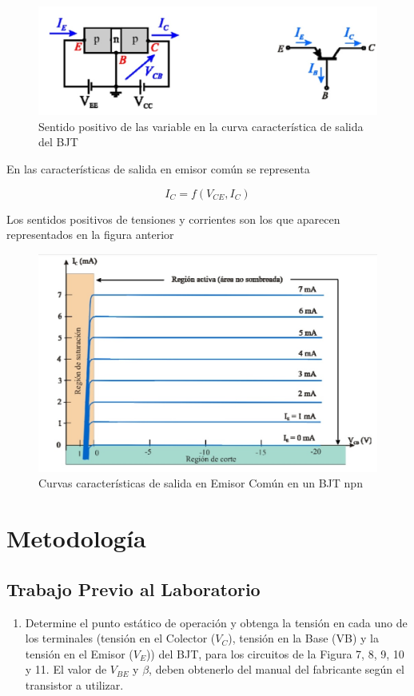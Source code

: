 \documentclass[10pt, a4paper]{article}
\begin{document}
    \begin{figure}[h!]
        \centering
        \includegraphics[height=4cm\textwidth]{salida.jpg}
        \caption{\label{fig:5} Sentido positivo de las variable en la curva característica de salida del BJT}
    \end{figure}

    En las características de salida en emisor común se representa
    
    $$I_C = f(V_{CE}, I_C)$$

    Los sentidos positivos de tensiones y corrientes son los que aparecen representados en la figura anterior

    \begin{figure}[h!]
        \centering
        \includegraphics[height=5cm\textwidth]{graficas.jpg}
        \caption{\label{fig:6} Curvas características de salida en Emisor Común en un BJT npn}
    \end{figure}

    \newpage
    \newpage

    \section{Metodología}

    \subsection{Trabajo Previo al Laboratorio}

    \begin{enumerate}
        \item 	Determine el punto estático de operación y obtenga la tensión en cada uno de los terminales (tensión en el Colector ($V_C$), tensión en la Base (VB) y la tensión en el Emisor ($V_E$)) del BJT, para los circuitos de la Figura 7, 8, 9, 10 y 11. El valor de $V_{BE}$ y $\beta$, deben obtenerlo del manual del fabricante según el transistor a utilizar.
    \end{enumerate}
\end{document}

